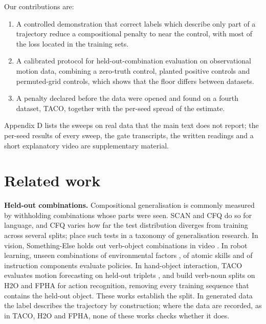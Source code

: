 \documentclass[10pt]{article}
\begin{document}
Our contributions are:

\begin{enumerate}
\item A controlled demonstration that correct labels which describe only part of a trajectory reduce a compositional penalty to near the control, with most of the loss located in the training sets.
\item A calibrated protocol for held-out-combination evaluation on observational motion data, combining a zero-truth control, planted positive controls and permuted-grid controls, which shows that the floor differs between datasets.
\item A penalty declared before the data were opened and found on a fourth dataset, TACO, together with the per-seed spread of the estimate.
\end{enumerate}

Appendix D lists the sweeps on real data that the main text does not report; the per-seed results of every sweep, the gate transcripts, the written readings and a short explanatory video are supplementary material.

\section{Related work}

\textbf{Held-out combinations.} Compositional generalisation is commonly measured by withholding combinations whose parts were seen. SCAN \citep{lake2018generalization} and CFQ \citep{keysers2020measuring} do so for language, and CFQ varies how far the test distribution diverges from training across several splits; \citet{hupkes2023taxonomy} place such tests in a taxonomy of generalisation research. In vision, Something-Else holds out verb-object combinations in video \citep{materzynska2020something}. In robot learning, unseen combinations of environmental factors \citep{gao2024efficient}, of atomic skills \citep{chen2025robohiman} and of instruction components \citep{wang2026diagnosing} evaluate policies. In hand-object interaction, TACO evaluates motion forecasting on held-out triplets \citep{liu2024taco}, and \citet{tse2025collaborative} build verb-noun splits on H2O and FPHA for action recognition, removing every training sequence that contains the held-out object. These works establish the split. In generated data the label describes the trajectory by construction; where the data are recorded, as in TACO, H2O and FPHA, none of these works checks whether it does.
\end{document}
